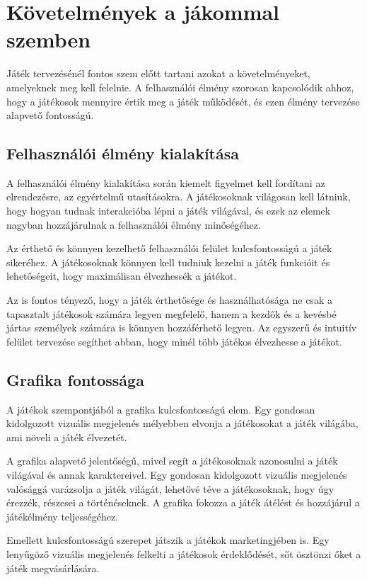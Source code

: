 \chapter{Követelmények a jákommal szemben}
Játék tervezésénél fontos szem előtt tartani azokat a követelményeket, amelyeknek meg kell felelnie. A felhasználói élmény szorosan kapcsolódik ahhoz, hogy a játékosok mennyire értik meg a játék működését, és ezen élmény tervezése alapvető fontosságú.


\section{Felhasználói élmény kialakítása}

A felhasználói élmény kialakítása során kiemelt figyelmet kell fordítani az elrendezésre, az egyértelmű utasításokra. A játékosoknak világosan kell látniuk, hogy hogyan tudnak interakcióba lépni a játék világával, és ezek az elemek nagyban hozzájárulnak a felhasználói élmény minőségéhez.

Az érthető és könnyen kezelhető felhasználói felület kulcsfontosságú a játék sikeréhez. A játékosoknak könnyen kell tudniuk kezelni a játék funkcióit és lehetőségeit, hogy maximálisan élvezhessék a játékot.

Az is fontos tényező, hogy a játék érthetősége és használhatósága ne csak a tapasztalt játékosok számára legyen megfelelő, hanem a kezdők és a kevésbé jártas személyek számára is könnyen hozzáférhető legyen. Az egyszerű és intuitív felület tervezése segíthet abban, hogy minél több játékos élvezhesse a játékot.


\section{Grafika fontossága}

A játékok szempontjából a grafika kulcsfontosságú elem. Egy gondosan kidolgozott vizuális megjelenés mélyebben elvonja a játékosokat a játék világába, ami növeli a játék élvezetét.

A grafika alapvető jelentőségű, mivel segít a játékosoknak azonosulni a játék világával és annak karaktereivel. Egy gondosan kidolgozott vizuális megjelenés valósággá varázsolja a játék világát, lehetővé téve a játékosoknak, hogy úgy érezzék, részesei a történéseknek. A grafika fokozza a játék átélést és hozzájárul a játékélmény teljességéhez.

Emellett kulcsfontosságú szerepet játszik a játékok marketingjében is. Egy lenyűgöző vizuális megjelenés felkelti a játékosok érdeklődését, sőt ösztönzi őket a játék megvásárlására.

\section{}